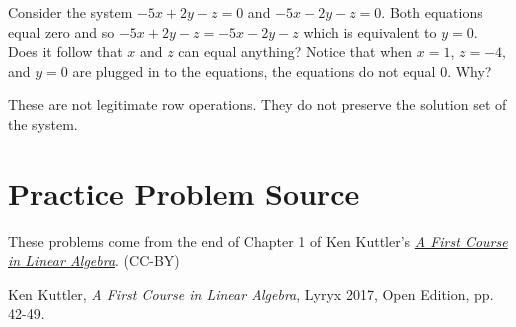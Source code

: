 \documentclass{ximera}
\begin{document}
\begin{problem}\label{prb:2.57} Consider the system $-5x+2y-z=0$ and $-5x-2y-z=0.$ Both equations
equal zero and so $-5x+2y-z=-5x-2y-z$ which is equivalent to $y=0.$ Does it follow that $x$
and $z$ can equal anything?  Notice that when $x=1$, $z=-4,$ and $y=0$ are plugged in
to the equations, the equations do not equal $0$. Why?
\begin{hint}
These are not legitimate row
operations. They do not preserve the solution set of the system.
\end{hint}
\end{problem}




\section*{Practice Problem Source}
These problems come from the end of Chapter 1 of Ken Kuttler's \href{https://open.umn.edu/opentextbooks/textbooks/a-first-course-in-linear-algebra-2017}{\it A First Course in Linear Algebra}. (CC-BY)

Ken Kuttler, {\it  A First Course in Linear Algebra}, Lyryx 2017, Open Edition, pp. 42-49. 
\end{document}
